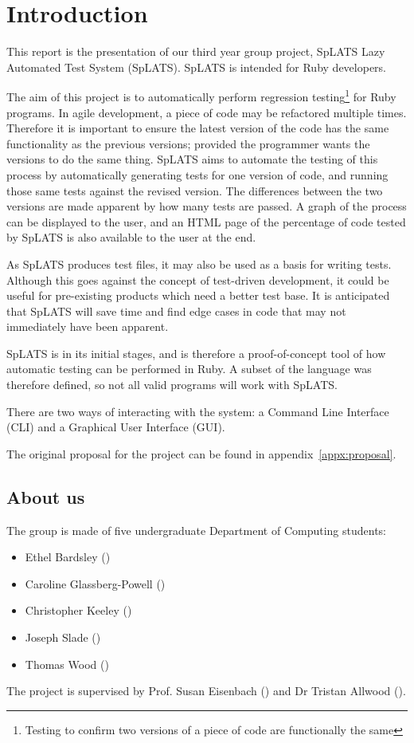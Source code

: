 \chapter{Introduction}

This report is the presentation of our third year group project, SpLATS Lazy Automated Test System (SpLATS). SpLATS is intended for Ruby developers.

The aim of this project is to automatically perform regression testing\footnote{Testing to confirm two versions of a piece of code are functionally the same} for Ruby programs. In agile development, a piece of code may be refactored multiple times. Therefore it is important to ensure the latest version of the code has the same functionality as the previous versions; provided the programmer wants the versions to do the same thing. SpLATS aims to automate the testing of this process by automatically generating tests for one version of code, and running those same tests against the revised version. The differences between the two versions are made apparent by how many tests are passed. A graph of the process can be displayed to the user, and an HTML page of the percentage of code tested by SpLATS is also available to the user at the end.

As SpLATS produces test files, it may also be used as a basis for writing tests. Although this goes against the concept of test-driven development, it could be useful for pre-existing products which need a better test base. It is anticipated that SpLATS will save time and find edge cases in code that may not immediately have been apparent.

SpLATS is in its initial stages, and is therefore a proof-of-concept tool of how automatic testing can be performed in Ruby. A subset of the language was therefore defined, so not all valid programs will work with SpLATS.

There are two ways of interacting with the system: a Command Line Interface (CLI) and a Graphical User Interface (GUI).

The original proposal for the project can be found in appendix~\ref{appx:proposal}.

\section{About us}
  The group is made of five undergraduate Department of Computing students:
  \begin{itemize}
    \item{Ethel Bardsley ()}
    \item{Caroline Glassberg-Powell ()}
    \item{Christopher Keeley ()}
    \item{Joseph Slade ()}
    \item{Thomas Wood ()}
  \end{itemize}

  The project is supervised by Prof. Susan Eisenbach () and Dr Tristan Allwood ().
